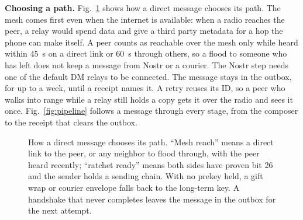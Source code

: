 \documentclass[conference]{IEEEtran}
\begin{document}
\textbf{Choosing a path.} Fig.~\ref{fig:ladder} shows how a direct message chooses its path. The mesh comes first even when the internet is available: when a radio reaches the peer, a relay would spend data and give a third party metadata for a hop the phone can make itself. A peer counts as reachable over the mesh only while heard within 45~s on a direct link or 60~s through others, so a flood to someone who has left does not keep a message from Nostr or a courier. The Nostr step needs one of the default DM relays to be connected. The message stays in the outbox, for up to a week, until a receipt names it. A retry reuses its ID, so a peer who walks into range while a relay still holds a copy gets it over the radio and sees it once. Fig.~\ref{fig:pipeline} follows a message through every stage, from the composer to the receipt that clears the outbox.

\begin{figure}[t]
\centering
{}
\caption{How a direct message chooses its path. ``Mesh reach'' means a direct link to the peer, or any neighbor to flood through, with the peer heard recently; ``ratchet ready'' means both sides have proven bit 26 and the sender holds a sending chain. With no prekey held, a gift wrap or courier envelope falls back to the long-term key. A handshake that never completes leaves the message in the outbox for the next attempt.}
\label{fig:ladder}
\end{figure}
\end{document}
